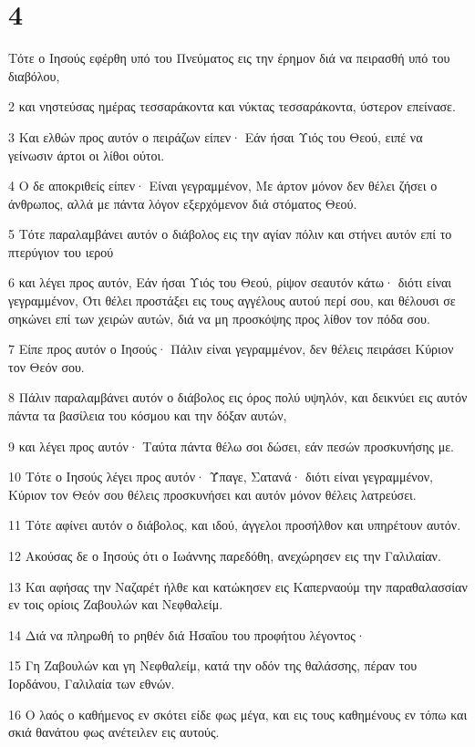 \chapter{4}

\par Τότε ο Ιησούς εφέρθη υπό του Πνεύματος εις την έρημον διά να πειρασθή υπό του διαβόλου,
\par 2 και νηστεύσας ημέρας τεσσαράκοντα και νύκτας τεσσαράκοντα, ύστερον επείνασε.
\par 3 Και ελθών προς αυτόν ο πειράζων είπεν· Εάν ήσαι Υιός του Θεού, ειπέ να γείνωσιν άρτοι οι λίθοι ούτοι.
\par 4 Ο δε αποκριθείς είπεν· Είναι γεγραμμένον, Με άρτον μόνον δεν θέλει ζήσει ο άνθρωπος, αλλά με πάντα λόγον εξερχόμενον διά στόματος Θεού.
\par 5 Τότε παραλαμβάνει αυτόν ο διάβολος εις την αγίαν πόλιν και στήνει αυτόν επί το πτερύγιον του ιερού
\par 6 και λέγει προς αυτόν, Εάν ήσαι Υιός του Θεού, ρίψον σεαυτόν κάτω· διότι είναι γεγραμμένον, Ότι θέλει προστάξει εις τους αγγέλους αυτού περί σου, και θέλουσι σε σηκώνει επί των χειρών αυτών, διά να μη προσκόψης προς λίθον τον πόδα σου.
\par 7 Είπε προς αυτόν ο Ιησούς· Πάλιν είναι γεγραμμένον, δεν θέλεις πειράσει Κύριον τον Θεόν σου.
\par 8 Πάλιν παραλαμβάνει αυτόν ο διάβολος εις όρος πολύ υψηλόν, και δεικνύει εις αυτόν πάντα τα βασίλεια του κόσμου και την δόξαν αυτών,
\par 9 και λέγει προς αυτόν· Ταύτα πάντα θέλω σοι δώσει, εάν πεσών προσκυνήσης με.
\par 10 Τότε ο Ιησούς λέγει προς αυτόν· Ύπαγε, Σατανά· διότι είναι γεγραμμένον, Κύριον τον Θεόν σου θέλεις προσκυνήσει και αυτόν μόνον θέλεις λατρεύσει.
\par 11 Τότε αφίνει αυτόν ο διάβολος, και ιδού, άγγελοι προσήλθον και υπηρέτουν αυτόν.
\par 12 Ακούσας δε ο Ιησούς ότι ο Ιωάννης παρεδόθη, ανεχώρησεν εις την Γαλιλαίαν.
\par 13 Και αφήσας την Ναζαρέτ ήλθε και κατώκησεν εις Καπερναούμ την παραθαλασσίαν εν τοις ορίοις Ζαβουλών και Νεφθαλείμ.
\par 14 Διά να πληρωθή το ρηθέν διά Ησαΐου του προφήτου λέγοντος·
\par 15 Γη Ζαβουλών και γη Νεφθαλείμ, κατά την οδόν της θαλάσσης, πέραν του Ιορδάνου, Γαλιλαία των εθνών.
\par 16 Ο λαός ο καθήμενος εν σκότει είδε φως μέγα, και εις τους καθημένους εν τόπω και σκιά θανάτου φως ανέτειλεν εις αυτούς.
